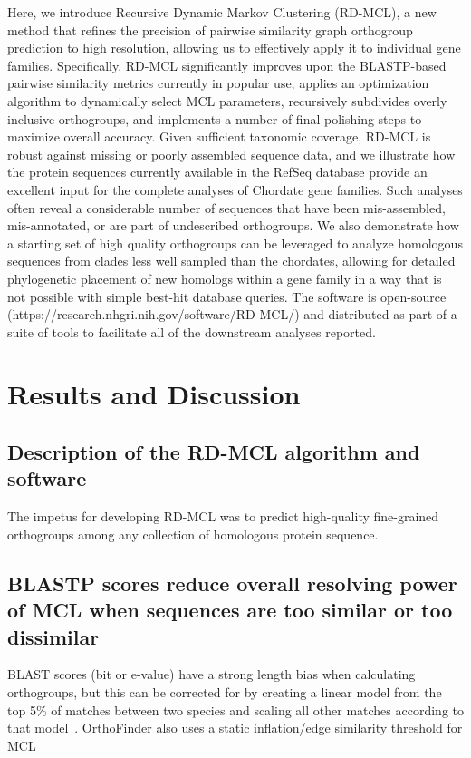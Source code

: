 \documentclass[twocolumn]{bmcart}%
\begin{document}
Here, we introduce Recursive Dynamic Markov Clustering (RD-MCL), a new method that refines the precision of pairwise similarity graph orthogroup prediction to high resolution, allowing us to effectively apply it to individual gene families.
Specifically, RD-MCL significantly improves upon the BLASTP-based pairwise similarity metrics currently in popular use, applies an optimization algorithm to dynamically select MCL parameters, recursively subdivides overly inclusive orthogroups, and implements a number of final polishing steps to maximize overall accuracy.
Given sufficient taxonomic coverage, RD-MCL is robust against missing or poorly assembled sequence data, and we illustrate how the protein sequences currently available in the RefSeq database provide an excellent input for the complete analyses of Chordate gene families.
Such analyses often reveal a considerable number of sequences that have been mis-assembled, mis-annotated, or are part of undescribed orthogroups.
We also demonstrate how a starting set of high quality orthogroups can be leveraged to analyze homologous sequences from clades less well sampled than the chordates, allowing for detailed phylogenetic placement of new homologs within a gene family in a way that is not possible with simple best-hit database queries.
The software is open-source (https://research.nhgri.nih.gov/software/RD-MCL/) and distributed as part of a suite of tools to facilitate all of the downstream analyses reported.



\section{Results and Discussion}\label{sec:resultsAndDiscussion}
\subsection{Description of the RD-MCL algorithm and software}\label{subsec:descriptionOfTheRd-mclAlgorithmAndSoftware}
The impetus for developing RD-MCL was to predict high-quality fine-grained orthogroups among any collection of homologous protein sequence.

\lipsum[3]

\subsection{BLASTP scores reduce overall resolving power of MCL when sequences are too similar or too dissimilar}\label{subsec:blastpScoresReduceOverallResolvingPowerOfMclWhenSequencesAreTooSimilarOrTooDissimilar}
BLAST scores (bit or e-value) have a strong length bias when calculating orthogroups, but this can be corrected for by creating a linear model from the top 5\% of matches between two species and scaling all other matches according to that model~\cite{Emms:2015ig}.
OrthoFinder also uses a static inflation/edge similarity threshold for MCL~\cite{Emms:2015ig}
\end{document}
